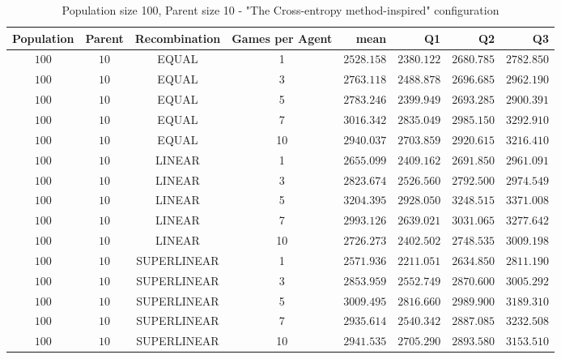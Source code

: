 \begin{table}[H]
\centering
\small
\begin{tabular}{c c c c r r r r}
Population & Parent & Recombination & Games per Agent & mean & Q1 & Q2 & Q3\\
\hline
$100$ & $10$ & EQUAL & 1 & $2528.158$ & $2380.122$ & $2680.785$ & $2782.850$\\
$100$ & $10$ & EQUAL & 3 & $2763.118$ & $2488.878$ & $2696.685$ & $2962.190$\\
$100$ & $10$ & EQUAL & 5 & $2783.246$ & $2399.949$ & $2693.285$ & $2900.391$\\
\hdashline
$100$ & $10$ & EQUAL & 7 & $3016.342$ & $2835.049$ & $2985.150$ & $3292.910$\\
\hdashline
$100$ & $10$ & EQUAL & 10 & $2940.037$ & $2703.859$ & $2920.615$ & $3216.410$\\
$100$ & $10$ & LINEAR & 1 & $2655.099$ & $2409.162$ & $2691.850$ & $2961.091$\\
$100$ & $10$ & LINEAR & 3 & $2823.674$ & $2526.560$ & $2792.500$ & $2974.549$\\
\hdashline
$100$ & $10$ & LINEAR & 5 & $3204.395$ & $2928.050$ & $3248.515$ & $3371.008$\\
\hdashline
$100$ & $10$ & LINEAR & 7 & $2993.126$ & $2639.021$ & $3031.065$ & $3277.642$\\
$100$ & $10$ & LINEAR & 10 & $2726.273$ & $2402.502$ & $2748.535$ & $3009.198$\\
$100$ & $10$ & SUPERLINEAR & 1 & $2571.936$ & $2211.051$ & $2634.850$ & $2811.190$\\
$100$ & $10$ & SUPERLINEAR & 3 & $2853.959$ & $2552.749$ & $2870.600$ & $3005.292$\\
\hdashline
$100$ & $10$ & SUPERLINEAR & 5 & $3009.495$ & $2816.660$ & $2989.900$ & $3189.310$\\
\hdashline
$100$ & $10$ & SUPERLINEAR & 7 & $2935.614$ & $2540.342$ & $2887.085$ & $3232.508$\\
$100$ & $10$ & SUPERLINEAR & 10 & $2941.535$ & $2705.290$ & $2893.580$ & $3153.510$\\
\end{tabular}
\caption{Population size 100, Parent size 10 - "The Cross-entropy method-inspired" configuration}
\end{table}


